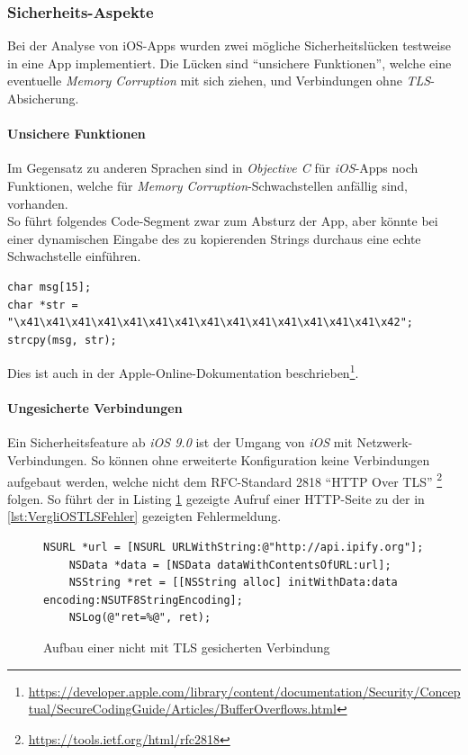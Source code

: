 \subsubsection{Sicherheits-Aspekte}
Bei der Analyse von iOS-Apps wurden zwei mögliche Sicherheitslücken testweise in eine App implementiert. Die Lücken sind "`unsichere Funktionen"', welche eine eventuelle \textit{Memory Corruption} mit sich ziehen, und Verbindungen ohne \textit{TLS}-Absicherung.

\pagebreak
\paragraph{Unsichere Funktionen}
Im Gegensatz zu anderen Sprachen sind in \textit{Objective C} für \textit{iOS}-Apps noch Funktionen, welche für \textit{Memory Corruption}-Schwachstellen anfällig sind, vorhanden.\\

So führt folgendes Code-Segment zwar zum Absturz der App, aber könnte bei einer dynamischen Eingabe des zu kopierenden Strings durchaus eine echte Schwachstelle einführen.
\begin{lstlisting}
char msg[15];
char *str = "\x41\x41\x41\x41\x41\x41\x41\x41\x41\x41\x41\x41\x41\x41\x42";
strcpy(msg, str);
\end{lstlisting}

Dies ist auch in der Apple-Online-Dokumentation beschrieben\footnote{\url{https://developer.apple.com/library/content/documentation/Security/Conceptual/SecureCodingGuide/Articles/BufferOverflows.html}}.

\paragraph{Ungesicherte Verbindungen}\label{ref:inseccon}
Ein Sicherheitsfeature ab \textit{iOS 9.0} ist der Umgang von \textit{iOS} mit Netzwerk-Verbindungen. So können ohne erweiterte Konfiguration keine Verbindungen aufgebaut werden, welche nicht dem RFC-Standard 2818  "`HTTP Over TLS"' \footnote{\url{https://tools.ietf.org/html/rfc2818}} folgen. So führt der in Listing \ref{lst:VergliOSTLSAufbau} gezeigte Aufruf einer HTTP-Seite zu der in \ref{lst:VergliOSTLSFehler} gezeigten Fehlermeldung.\\

\begin{figure}[p]
\begin{lstlisting}
NSURL *url = [NSURL URLWithString:@"http://api.ipify.org"];
    NSData *data = [NSData dataWithContentsOfURL:url];
    NSString *ret = [[NSString alloc] initWithData:data encoding:NSUTF8StringEncoding];
    NSLog(@"ret=%@", ret);
\end{lstlisting} 
\caption{Aufbau einer nicht mit TLS gesicherten Verbindung}
\label{lst:VergliOSTLSAufbau}
\end{figure}

